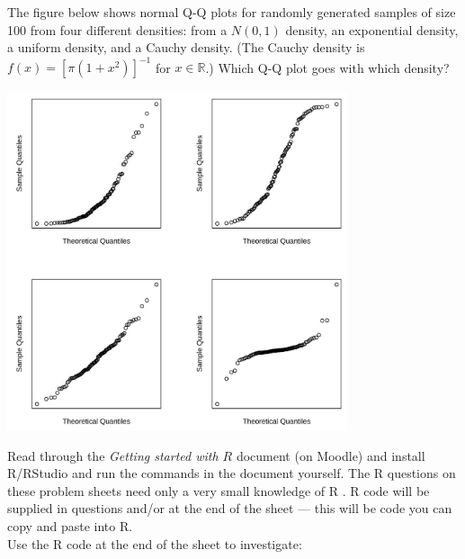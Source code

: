 \documentclass[answers]{exam}
\begin{document}
\begin{questions}



\question%
The figure below shows normal Q-Q plots for randomly generated samples of size 100 from four different densities: from a $N(0,1)$ density, an exponential density, a uniform density, and a Cauchy density. (The Cauchy density is $f(x)=[\pi(1+x^{2})]^{-1}$ for $x \in \mathbb{R}$.) Which Q-Q plot goes with which density?
\begin{center}\includegraphics[width=10cm]{sheet 1 q 7}\end{center}



\question%
Read through the \emph{Getting started with $R$} document (on Moodle) and install R/RStudio and run the commands in the document yourself. The R questions on these problem sheets need only a very small knowledge of R . R code will be supplied in questions and/or at the end of the sheet --- this will be code you can copy and paste into R.\\ Use the R code at the end of the sheet to investigate:
\end{questions}
\end{document}
